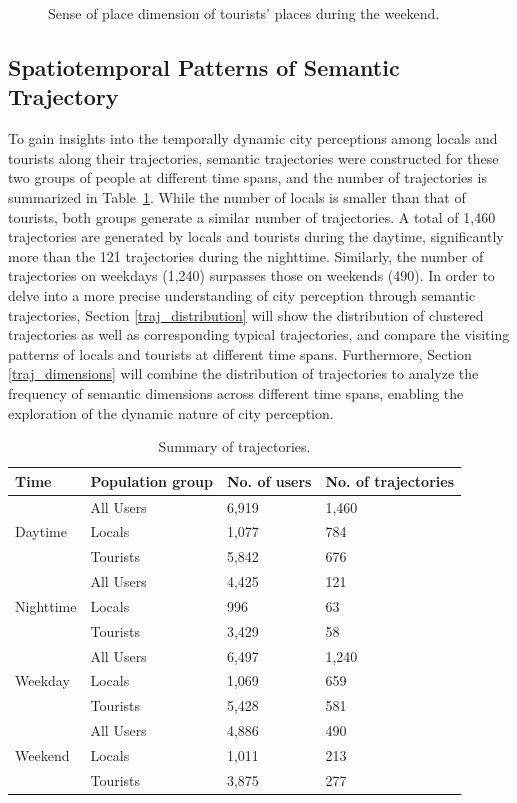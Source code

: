 \documentclass{article}
\theoremstyle{remark}
\begin{document}
\begin{figure}[!h]
    \caption{Sense of place dimension of tourists' places during the weekend.}
    \label{fig:places_topics_sense_tourists_weekend}
\end{figure}

\clearpage

\subsection{Spatiotemporal Patterns of Semantic Trajectory} \label{patterns_traj}
To gain insights into the temporally dynamic city perceptions among locals and tourists along their trajectories, semantic trajectories were constructed for these two groups of people at different time spans, and the number of trajectories is summarized in Table~\ref{tab:trajectories_summary}. While the number of locals is smaller than that of tourists, both groups generate a similar number of trajectories. A total of 1,460 trajectories are generated by locals and tourists during the daytime, significantly more than the 121 trajectories during the nighttime. Similarly, the number of trajectories on weekdays (1,240) surpasses those on weekends (490). In order to delve into a more precise understanding of city perception through semantic trajectories, Section \ref{traj_distribution} will show the distribution of clustered trajectories as well as corresponding typical trajectories, and compare the visiting patterns of locals and tourists at different time spans. Furthermore, Section \ref{traj_dimensions} will combine the distribution of trajectories to analyze the frequency of semantic dimensions across different time spans, enabling the exploration of the dynamic nature of city perception.


\begin{table}[h!]
\centering
\caption{\label{tab:trajectories_summary}Summary of trajectories.}
\begin{tabular}{llll} \hline
Time & Population group & No. of users & No. of trajectories \\
\hline
\multirow{3}{*}{Daytime} 
& All Users & 6,919 & 1,460 \\
& Locals & 1,077 & 784 \\
& Tourists & 5,842 & 676 \\
\hline
\multirow{3}{*}{Nighttime} 
& All Users & 4,425 & 121 \\
& Locals & 996 & 63 \\
& Tourists & 3,429 & 58 \\
\hline
\multirow{3}{*}{Weekday} 
& All Users & 6,497 & 1,240 \\
& Locals & 1,069 & 659 \\
& Tourists & 5,428 & 581 \\
\hline
\multirow{3}{*}{Weekend} 
& All Users & 4,886 & 490 \\
& Locals & 1,011 & 213 \\
& Tourists & 3,875 & 277 \\
\hline
\end{tabular}
\end{table}
\end{document}
